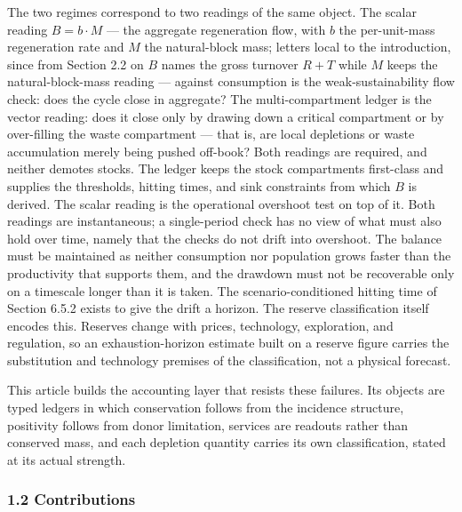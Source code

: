 \documentclass[11pt]{article}
\begin{document}
The two regimes correspond to two readings of the same object. The
scalar reading \(B = b\cdot M\) --- the aggregate regeneration flow,
with \(b\) the per-unit-mass regeneration rate and \(M\) the
natural-block mass; letters local to the introduction, since from
Section 2.2 on \(B\) names the gross turnover \(R + T\) while \(M\)
keeps the natural-block-mass reading --- against consumption is the
weak-sustainability flow check: does the cycle close in aggregate? The
multi-compartment ledger is the vector reading: does it close only by
drawing down a critical compartment or by over-filling the waste
compartment --- that is, are local depletions or waste accumulation
merely being pushed off-book? Both readings are required, and neither
demotes stocks. The ledger keeps the stock compartments first-class and
supplies the thresholds, hitting times, and sink constraints from which
\(B\) is derived. The scalar reading is the operational overshoot test
on top of it. Both readings are instantaneous; a single-period check has
no view of what must also hold over time, namely that the checks do not
drift into overshoot. The balance must be maintained as neither
consumption nor population grows faster than the productivity that
supports them, and the drawdown must not be recoverable only on a
timescale longer than it is taken. The scenario-conditioned hitting time
of Section 6.5.2 exists to give the drift a horizon. The reserve
classification itself encodes this. Reserves change with prices,
technology, exploration, and regulation, so an exhaustion-horizon
estimate built on a reserve figure carries the substitution and
technology premises of the classification, not a physical forecast.

This article builds the accounting layer that resists these failures.
Its objects are typed ledgers in which conservation follows from the
incidence structure, positivity follows from donor limitation, services
are readouts rather than conserved mass, and each depletion quantity
carries its own classification, stated at its actual strength.

\subsubsection{1.2 Contributions}\label{contributions}
\end{document}
